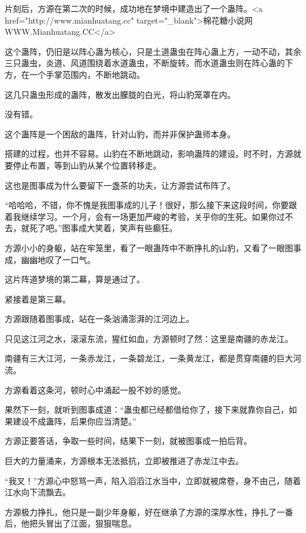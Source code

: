 
\begin{this_body}

片刻后，方源在第二次的时候，成功地在梦境中建造出了一个蛊阵。<a href="http://www.mianhuatang.cc" target="\_blank">棉花糖小说网WWW.Mianhuatang.CC</a>

这个蛊阵，仍旧是以阵心蛊为核心，只是土道蛊虫在阵心蛊上方，一动不动，其余三只蛊虫，炎道、风道围绕着水道蛊虫，不断旋转。而水道蛊虫则在阵心蛊的下方，在一个手掌范围内，不断地跳动。

这几只蛊虫形成的蛊阵，散发出朦胧的白光，将山豹笼罩在内。

没有错。

这个蛊阵是一个困敌的蛊阵，针对山豹，而并非保护蛊师本身。

搭建的过程，也并不容易。山豹在不断地跳动，影响蛊阵的建设。时不时，方源就要停止布置，等到山豹从某个位置转移走。

这也是图事成为什么要留下一盏茶的功夫，让方源尝试布阵了。

“哈哈哈，不错，你不愧是我图事成的儿子！很好，那么接下来这段时间，你要跟着我继续学习。一个月，会有一场更加严峻的考验，关乎你的生死。如果你过不去，就死了吧。”图事成大笑着，笑声有些癫狂。

方源小小的身躯，站在牢笼里，看了一眼蛊阵中不断挣扎的山豹，又看了一眼图事成，幽幽地叹了一口气。

这片阵道梦境的第二幕，算是通过了。

紧接着是第三幕。

方源跟随着图事成，站在一条汹涌澎湃的江河边上。

只见这江河之水，滚滚东流，猩红如血，方源顿时了然：这里是南疆的赤龙江。

南疆有三大江河，一条赤龙江，一条碧龙江，一条黄龙江，都是贯穿南疆的巨大河流。

方源看着这条河，顿时心中涌起一股不妙的感觉。

果然下一刻，就听到图事成道：“蛊虫都已经都借给你了，接下来就靠你自己，如果建设不成蛊阵，后果你应当清楚。”

方源正要答话，争取一些时间，结果下一刻，就被图事成一拍后背。

巨大的力量涌来，方源根本无法抵抗，立即被推进了赤龙江中去。

“我叉！”方源心中怒骂一声，陷入滔滔江水当中，立即就被席卷，身不由己，随着江水向下流飘去。

方源极力挣扎，他只是一副少年身躯，好在继承了方源的深厚水性，挣扎了一番后，他把头冒出了江面，狠狠喘息。


\end{this_body}
